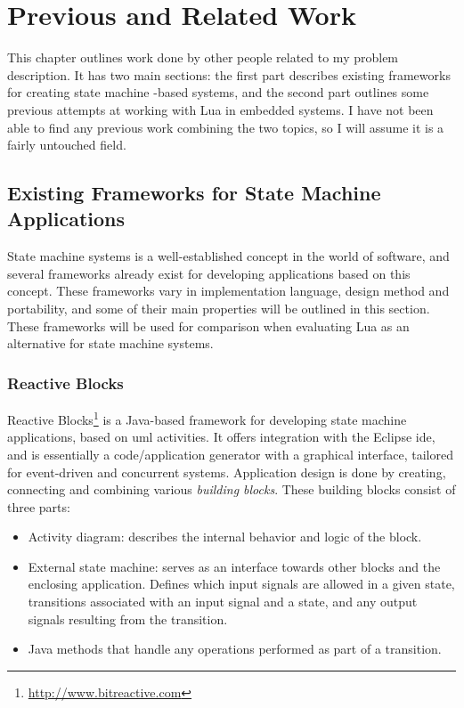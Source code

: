 \chapter{Previous and Related Work}
\label{ch:related_work}
This chapter outlines work done by other people related to my problem description. It has two main sections: the first part describes existing frameworks for creating state machine -based systems, and the second part outlines some previous attempts at working with Lua in embedded systems. I have not been able to find any previous work combining the two topics, so I will assume it is a fairly untouched field.

\section{Existing Frameworks for State Machine Applications}
\label{sec:existing_frameworks_state_machine}
State machine systems is a well-established concept in the world of software, and several frameworks already exist for developing applications based on this concept. These frameworks vary in implementation language, design method and portability, and some of their main properties will be outlined in this section. These frameworks will be used for comparison when evaluating Lua as an alternative for state machine systems.

\subsection{Reactive Blocks}
\label{sec:reactive_blocks}
Reactive Blocks\footnote{\url{http://www.bitreactive.com}} is a Java-based framework for developing state machine applications, based on \gls{uml} activities. It offers integration with the Eclipse \gls{ide}, and is essentially a code/application generator with a graphical interface, tailored for event-driven and concurrent systems. Application design is done by creating, connecting and combining various \emph{building blocks}. These building blocks consist of three parts:
\begin{itemize}
	\item Activity diagram: describes the internal behavior and logic of the block.
	\item External state machine: serves as an interface towards other blocks and the enclosing application. Defines which input signals are allowed in a given state, transitions associated with an input signal and a state, and any output signals resulting from the transition.
	\item Java methods that handle any operations performed as part of a transition.
\end{itemize}

